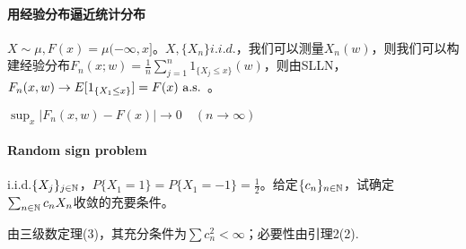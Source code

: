 \documentclass{ctexart}
\begin{document}
\paragraph{用经验分布逼近统计分布}
$X\sim\mu, F(x)=\mu(-\infty,x]$。$X,\{X_{n}\}i.i.d.$，我们可以测量$X_{n}(w)$，则我们可以构建经验分布$F_{n}(x;w)=\frac{1}{n}\sum_{j=1}^{n}1_{\{X_{j}\leq x\}}(w)$，则由SLLN，$F_{n}(x,w)\to E[1_{\{X_{1}\leq x\}}]=
F(x)\text{ a.s. }$。

\begin{Prop}
  $\sup_{x}|F_{n}(x,w)-F(x)|\to 0\quad (n\to\infty)$
\end{Prop}

\paragraph{Random sign problem}
i.i.d.$\{X_{j}\}_{j\in\mathbb{N}}$，$P\{X_{1}=1\}=P\{X_{1}=-1\}=\frac{1}{2}$。给定$\{c_{n}\}_{n\in\mathbb{N}}$，试确定$\sum_{n\in\mathbb{N}}c_{n}X_{n}$收敛的充要条件。

由三级数定理(3)，其充分条件为$\sum c_{n}^{2}<\infty$；必要性由引理2(2).
\ifx\allfiles\undefined
\end{document}
